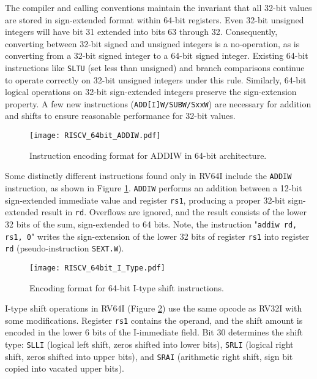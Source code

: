 The compiler and calling conventions maintain the invariant that all 32-bit values are stored in sign-extended format within 64-bit registers. Even 32-bit unsigned integers will have bit 31 extended into bits 63 through 32. Consequently, converting between 32-bit signed and unsigned integers is a no-operation, as is converting from a 32-bit signed integer to a 64-bit signed integer. Existing 64-bit instructions like \texttt{SLTU} (set less than unsigned) and branch comparisons continue to operate correctly on 32-bit unsigned integers under this rule. Similarly, 64-bit logical operations on 32-bit sign-extended integers preserve the sign-extension property. A few new instructions (\texttt{ADD[I]W/SUBW/SxxW}) are necessary for addition and shifts to ensure reasonable performance for 32-bit values.

\begin{figure}[h!]
    \centering
    \texttt{[image: RISCV\_64bit\_ADDIW.pdf]}
    \caption{Instruction encoding format for ADDIW in 64-bit architecture. \cite{waterman2014riscv}}
    \label{fig:addiw_format}
\end{figure}

Some distinctly different instructions found only in RV64I include the \texttt{ADDIW} instruction, as shown in Figure \ref{fig:addiw_format}. \texttt{ADDIW} performs an addition between a 12-bit sign-extended immediate value and register \texttt{rs1}, producing a proper 32-bit sign-extended result in \texttt{rd}. Overflows are ignored, and the result consists of the lower 32 bits of the sum, sign-extended to 64 bits. Note, the instruction "\texttt{addiw rd, rs1, 0}" writes the sign-extension of the lower 32 bits of register \texttt{rs1} into register \texttt{rd} (pseudo-instruction \texttt{SEXT.W}).

\begin{figure}[h!]
    \centering
    \texttt{[image: RISCV\_64bit\_I\_Type.pdf]}
    \caption{Encoding format for 64-bit I-type shift instructions. \cite{waterman2014riscv}}
    \label{fig:rv64i_shift_i_format}
\end{figure}

I-type shift operations in RV64I (Figure \ref{fig:rv64i_shift_i_format}) use the same opcode as RV32I with some modifications. Register \texttt{rs1} contains the operand, and the shift amount is encoded in the lower 6 bits of the I-immediate field. Bit 30 determines the shift type: \texttt{SLLI} (logical left shift, zeros shifted into lower bits), \texttt{SRLI} (logical right shift, zeros shifted into upper bits), and \texttt{SRAI} (arithmetic right shift, sign bit copied into vacated upper bits).

